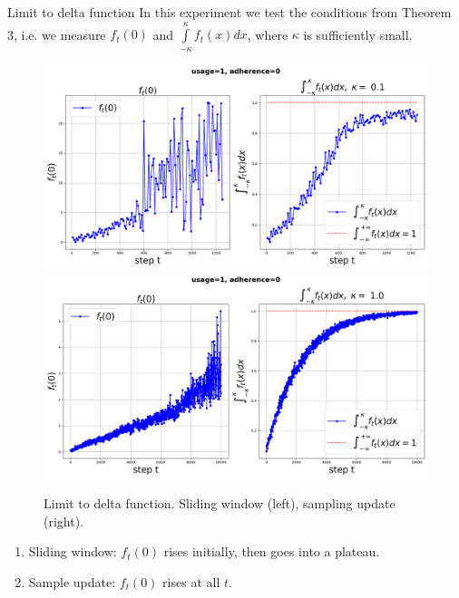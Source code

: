 \documentclass[aspectratio=169]{beamer}
\begin{document}
    \begin{frame}{Limit to delta function}
        \small
        In this experiment we test the conditions from Theorem 3, i.e. we measure $f_t(0)$ and $\int\limits_{-\kappa}^{\kappa}f_t(x)dx$, where $\kappa$ is sufficiently small. 

        \begin{figure}[h!]
            \centering
            \includegraphics[width=0.4\linewidth]{pictures/ft0_loop_1_0.png}
            \includegraphics[width=0.4\linewidth]{pictures/ft0_sample_1_0.png}
                    
            \caption{Limit to delta function. Sliding window (left), sampling update (right).}
            
            \label{delta_loop}
        \end{figure}

        \begin{enumerate}
            \item Sliding window: $f_t(0)$ rises initially, then goes into a plateau.

            \item Sample update: $f_t(0)$ rises at all $t$.
        \end{enumerate}
        
    \end{frame}
\end{document}
